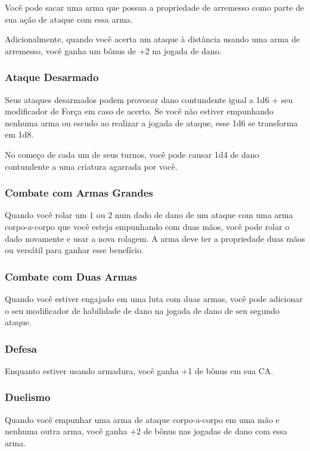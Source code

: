 \documentclass{RPG_Adventure}[2021/10/20]
\begin{document}
\begin{multicols}{2}
Você pode sacar uma arma que possua a propriedade de arremesso como parte de sua
ação de ataque com essa arma.

Adicionalmente, quando você acerta um ataque à distância usando uma arma de
arremesso, você ganha um bônus de +2 na jogada de dano.

\subsubsection{Ataque Desarmado}%

Seus ataques desarmados podem provocar dano contundente igual a 1d6 + seu
modificador de Força em caso de acerto. Se você não estiver empunhando nenhuma
arma ou escudo ao realizar a jogada de ataque, esse 1d6 se transforma em 1d8.

No começo de cada um de seus turnos, você pode causar 1d4 de dano contundente a
uma criatura agarrada por você.

\subsubsection{Combate com Armas Grandes}%

Quando você rolar um $1$ ou $2$ num dado de dano de um ataque com uma arma
corpo-a-corpo que você esteja empunhando com duas mãos, você pode rolar o dado
novamente e usar a nova rolagem. A arma deve ter a propriedade duas mãos ou
versátil para ganhar esse benefício.

\subsubsection{Combate com Duas Armas}%

Quando você estiver engajado em uma luta com duas armas, você pode adicionar o
seu modificador de habilidade de dano na jogada de dano de seu segundo ataque.

\subsubsection{Defesa}%

Enquanto estiver usando armadura, você ganha +1 de bônus em sua CA.

\subsubsection{Duelismo}%

Quando você empunhar uma arma de ataque corpo-a-corpo em uma mão e nenhuma outra
arma, você ganha +2 de bônus nas jogadas de dano com essa arma.


\end{multicols}
\end{document}
